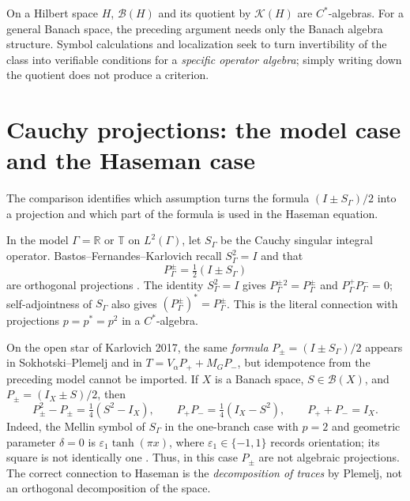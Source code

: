 On a Hilbert space $H$, $\mathcal B(H)$ and its quotient by $\mathcal K(H)$ are
$C^*$-algebras. For a general Banach space, the preceding argument needs only
the Banach algebra structure. Symbol calculations and localization seek to turn
invertibility of the class into verifiable conditions for a \emph{specific operator
algebra}; simply writing down the quotient does not produce a criterion.

\section{Cauchy projections: the model case and the Haseman case}

The comparison identifies which assumption turns the formula $(I\pm S_\Gamma)/2$
into a projection and which part of the formula is used in the Haseman equation.

In the model $\Gamma=\mathbb R$ or $\mathbb T$ on $L^2(\Gamma)$, let $S_\Gamma$
be the Cauchy singular integral operator. Bastos--Fernandes--Karlovich recall
$S_\Gamma^2=I$ and that
\[
 P_\Gamma^\pm=\tfrac12(I\pm S_\Gamma)
\]
are orthogonal projections \cite[§2, p.~22]{BFK2006}. The identity
$S_\Gamma^2=I$ gives $P_\Gamma^\pm{}^2=P_\Gamma^\pm$ and
$P_\Gamma^+P_\Gamma^-=0$; self-adjointness of $S_\Gamma$ also gives
$(P_\Gamma^\pm)^*=P_\Gamma^\pm$. This is the literal connection with
projections $p=p^*=p^2$ in a $C^*$-algebra.

\begin{center}
\end{center}

On the open star of Karlovich 2017, the same \emph{formula}
$P_\pm=(I\pm S_\Gamma)/2$ appears in Sokhotski--Plemelj and in
$T=V_\alpha P_++M_GP_-$, but idempotence from the preceding model cannot
be imported. If $X$ is a Banach space, $S\in\mathcal B(X)$, and
$P_\pm=(I_X\pm S)/2$, then
\[
 P_\pm^2-P_\pm=\tfrac14(S^2-I_X),\qquad
 P_+P_-=\tfrac14(I_X-S^2),\qquad P_++P_-=I_X.
\]
Indeed, the Mellin symbol of $S_\Gamma$ in the one-branch case with $p=2$
and geometric parameter $\delta=0$ is $\varepsilon_1\tanh(\pi x)$, where
$\varepsilon_1\in\{-1,1\}$ records orientation; its square is not
identically one \cite[Theorem~5.3, p.~476]{Karlovich2017}.
Thus, in this case $P_\pm$ are not algebraic projections.
The correct connection to Haseman is the \emph{decomposition of traces}
by Plemelj, not an orthogonal decomposition of the space.

